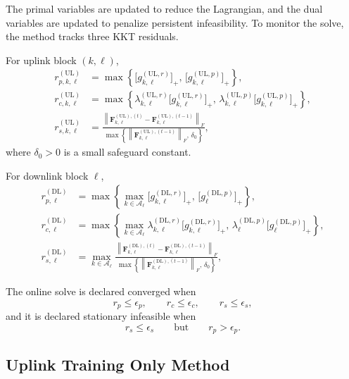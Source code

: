 \documentclass[11pt]{article}
\newcommand{\Aset}{\mathcal{A}}
\newcommand{\F}{\mathbf{F}}
\newcommand{\norm}[1]{\left\lVert #1 \right\rVert}
\newcommand{\UL}{\mathrm{UL}}
\newcommand{\DL}{\mathrm{DL}}
\begin{document}
The primal variables are updated to reduce the Lagrangian, and the dual
variables are updated to penalize persistent infeasibility. To monitor the
solve, the method tracks three KKT residuals.

For uplink block $(k,\ell)$,
\begin{align}
r_{p,k,\ell}^{(\UL)}
&=
\max\!\left\{
\bigl[g_{k,\ell}^{(\UL,r)}\bigr]_+,\,
\bigl[g_{k,\ell}^{(\UL,p)}\bigr]_+
\right\},
\label{eq:ul-rp}
\\
r_{c,k,\ell}^{(\UL)}
&=
\max\!\left\{
\lambda_{k,\ell}^{(\UL,r)}\bigl[g_{k,\ell}^{(\UL,r)}\bigr]_+,\,
\lambda_{k,\ell}^{(\UL,p)}\bigl[g_{k,\ell}^{(\UL,p)}\bigr]_+
\right\},
\label{eq:ul-rc}
\\
r_{s,k,\ell}^{(\UL)}
&=
\frac{
\norm{
\F_{k,\ell}^{(\UL),(t)}-\F_{k,\ell}^{(\UL),(t-1)}
}_F
}{
\max\!\left\{
\norm{\F_{k,\ell}^{(\UL),(t-1)}}_F,\,
\delta_0
\right\}
},
\label{eq:ul-rs}
\end{align}
where $\delta_0>0$ is a small safeguard constant.

For downlink block $\ell$,
\begin{align}
r_{p,\ell}^{(\DL)}
&=
\max\!\left\{
\max_{k\in\Aset_\ell}\bigl[g_{k,\ell}^{(\DL,r)}\bigr]_+,\,
\bigl[g_{\ell}^{(\DL,p)}\bigr]_+
\right\},
\label{eq:dl-rp}
\\
r_{c,\ell}^{(\DL)}
&=
\max\!\left\{
\max_{k\in\Aset_\ell}
\lambda_{k,\ell}^{(\DL,r)}\bigl[g_{k,\ell}^{(\DL,r)}\bigr]_+,\,
\lambda_{\ell}^{(\DL,p)}\bigl[g_{\ell}^{(\DL,p)}\bigr]_+
\right\},
\label{eq:dl-rc}
\\
r_{s,\ell}^{(\DL)}
&=
\max_{k\in\Aset_\ell}
\frac{
\norm{
\F_{k,\ell}^{(\DL),(t)}-\F_{k,\ell}^{(\DL),(t-1)}
}_F
}{
\max\!\left\{
\norm{\F_{k,\ell}^{(\DL),(t-1)}}_F,\,
\delta_0
\right\}
},
\label{eq:dl-rs}
\end{align}

The online solve is declared converged when
\begin{equation}
r_p \le \epsilon_p,
\qquad
r_c \le \epsilon_c,
\qquad
r_s \le \epsilon_s,
\label{eq:kkt-convergence}
\end{equation}
and it is declared stationary infeasible when
\begin{equation}
r_s \le \epsilon_s
\qquad \text{but} \qquad
r_p > \epsilon_p.
\label{eq:kkt-stationary-infeasible}
\end{equation}

\subsection{Uplink Training Only Method}
\end{document}
